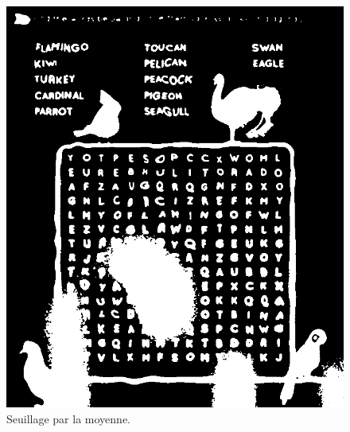 \documentclass{article}
\begin{document}
\begin{itemize}
\begin{figure}[H]
        \includegraphics[width=\linewidth]{ressources/image_3_word_detection_05_mean_threshold.png}
        \caption{}
      \endminipage
      \caption{Seuillage par la moyenne.}
    \end{figure}
\end{itemize}
\end{document}
